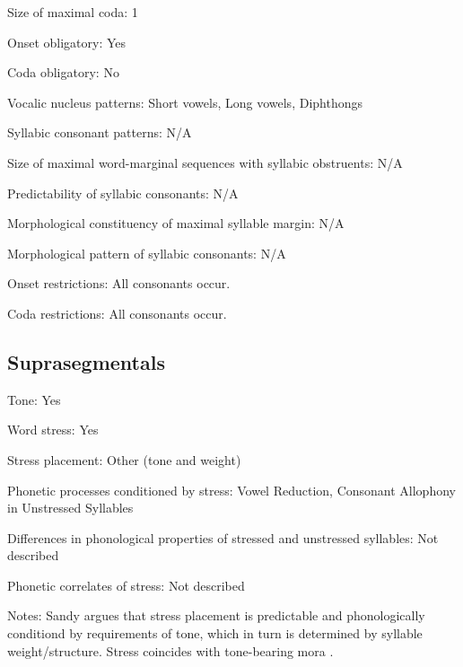 {\begin{appendixdesc}
\item[Size of maximal coda:] 1

\item[Onset obligatory:] Yes

\item[Coda obligatory:] No

\item[Vocalic nucleus patterns:] Short vowels, Long vowels, Diphthongs

\item[Syllabic consonant patterns:] N/A

\item[Size of maximal word-marginal sequences with syllabic obstruents:] N/A

\item[Predictability of syllabic consonants:] N/A

\item[Morphological constituency of maximal syllable margin:] N/A

\item[Morphological pattern of syllabic consonants:] N/A

\item[Onset restrictions:] All consonants occur.

\item[Coda restrictions:] All consonants occur.
\end{appendixdesc}
\subsection*{Suprasegmentals}
\begin{appendixdesc}
\item[Tone:] Yes

\item[Word stress:] Yes

\item[Stress placement:] Other (tone and weight)

\item[Phonetic processes conditioned by stress:] Vowel Reduction, Consonant Allophony in Unstressed Syllables

\item[Differences in phonological properties of stressed and unstressed syllables:] Not described

\item[Phonetic correlates of stress:] Not described

\item[Notes:] Sandy argues that stress placement is predictable and phonologically conditiond by requirements of tone, which in turn is determined by syllable weight/structure. Stress coincides with tone-bearing mora \citep[40]{Sandy2014}.
\end{appendixdesc}
}
